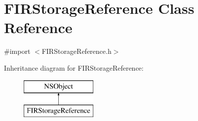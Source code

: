 \hypertarget{interface_f_i_r_storage_reference}{}\section{F\+I\+R\+Storage\+Reference Class Reference}
\label{interface_f_i_r_storage_reference}


{\ttfamily \#import $<$F\+I\+R\+Storage\+Reference.\+h$>$}

Inheritance diagram for F\+I\+R\+Storage\+Reference\+:\begin{figure}[H]
\begin{center}
\leavevmode
\includegraphics[height=2.000000cm]{interface_f_i_r_storage_reference}
\end{center}
\end{figure}
